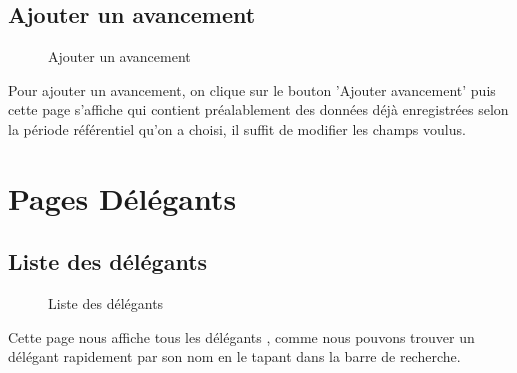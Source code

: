 \documentclass[a4paper]{report}
\begin{document}
\subsection{Ajouter un avancement}
\begin{figure}[H]
	\begin{center}
		\caption{Ajouter un avancement}
	\end{center}
\end{figure}
Pour ajouter un avancement, on clique sur le bouton 'Ajouter avancement' puis cette page s'affiche qui contient préalablement des données déjà enregistrées selon la période référentiel qu'on a choisi, il suffit de modifier les champs voulus.
\section{Pages Délégants}
\subsection{Liste des délégants}
\begin{figure}[H]
	\begin{center}
		\caption{Liste des délégants}
	\end{center}
\end{figure}
Cette page nous affiche tous les délégants , comme nous pouvons trouver un délégant rapidement par son nom en le tapant dans la barre de recherche.
\end{document}
